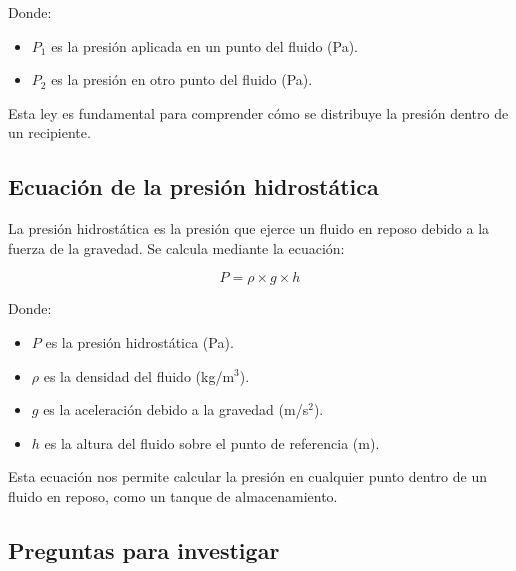 \documentclass[../main]{subfiles}
\begin{document}
Donde:
\begin{itemize}
    \item $P_1$ es la presión aplicada en un punto del fluido (Pa).
    \item $P_2$ es la presión en otro punto del fluido (Pa).
\end{itemize}

Esta ley es fundamental para comprender cómo se distribuye la presión dentro de un recipiente.

\subsection{Ecuación de la presión hidrostática}

La presión hidrostática es la presión que ejerce un fluido en reposo debido a la fuerza de la gravedad. Se calcula mediante la ecuación:

\begin{equation}
P = \rho \times g \times h
\end{equation}

Donde:
\begin{itemize}
    \item $P$ es la presión hidrostática (Pa).
    \item $\rho$ es la densidad del fluido (kg/m$^3$).
    \item $g$ es la aceleración debido a la gravedad (m/s$^2$).
    \item $h$ es la altura del fluido sobre el punto de referencia (m).
\end{itemize}

Esta ecuación nos permite calcular la presión en cualquier punto dentro de un fluido en reposo, como un tanque de almacenamiento.

\subsection{Preguntas para investigar}
\end{document}
